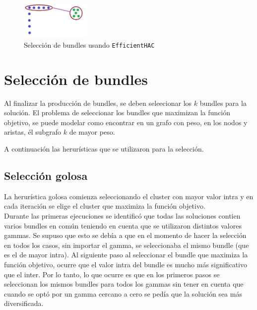 \begin{figure}[H]
  \centering
    \includegraphics[width=0.3\textwidth]{img/cluster2.png}
  \caption{Selección de bundles usando \texttt{EfficientHAC}}
  \label{res:img-usingEfficientHAC}
\end{figure}

\section{Selección de bundles}
Al finalizar la producción de bundles, se deben seleecionar los $k$ bundles para la solución.
El problema de seleccionar los bundles que maximizan la función objetivo, se puede modelar como
encontrar en un grafo con peso, en los nodos y aristas, él subgrafo $k$ de mayor peso.

A continuación las herurísticas que se utilizaron para la selección.
\subsection{Selección golosa}
La herurística golosa comienza seleccionando el cluster con mayor valor intra y en cada iteración 
se elige el cluster que maximiza la función objetivo.\\
Durante las primeras ejecuciones se identificó que todas las soluciones contien varios bundles en común 
teniendo en cuenta que se utilizaron distintos valores gammas. Se supuso que esto se debía a que en 
el momento de hacer la selección en todos los casos, sin importar el gamma, se seleccionaba el mismo 
bundle (que es el de mayor intra). Al siguiente paso al seleccionar el bundle que maximiza la 
función objetivo, ocurre que el valor intra del bundle es mucho más significativo que el inter. Por 
lo tanto, lo que ocurre es que en los primeros pasos se seleccionan los mismos bundles para todos 
los gammas sin tener en cuenta que cuando se optó por un gamma cercano a cero se pedía que la 
solución sea más diversificada.\\
